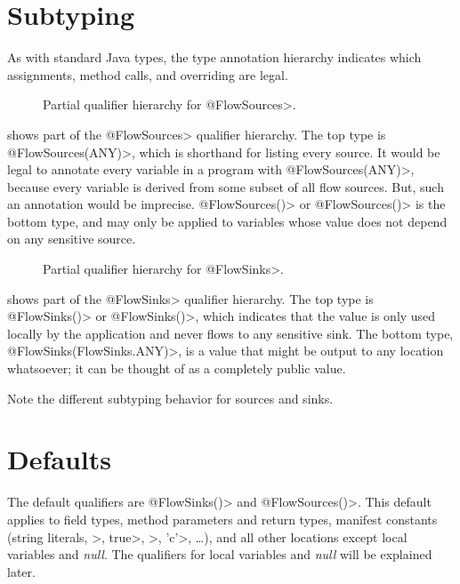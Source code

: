 \section{Subtyping}

As with standard Java types, the type annotation hierarchy indicates which
assignments, method calls, and overriding are legal.


\begin{figure}
\caption{Partial qualifier hierarchy for \<@FlowSources>.}
\label{fig:flowsources-hierarchy}
\end{figure}

 shows part of the \<@FlowSources>
qualifier hierarchy.  The top type is \<@FlowSources(ANY)>, which is
shorthand for listing every source.  It would be legal to annotate every
variable in a program with \<@FlowSources(ANY)>, because every variable is
derived from some subset of all flow sources.  But, such an annotation
would be imprecise.  \<@FlowSources(\ttcbs)> or \<@FlowSources()> is the
bottom type, and may only
be applied to variables whose value does not depend on any sensitive
source.


\begin{figure}
\caption{Partial qualifier hierarchy for \<@FlowSinks>.}
\label{fig:flowsinks-hierarchy}
\end{figure}

 shows part of the \<@FlowSinks>
qualifier hierarchy.  The top type is \<@FlowSinks(\ttcbs)> or
\<@FlowSinks()>, which indicates
that the value is only used locally by the application and never flows to
any sensitive sink.  The bottom type, \<@FlowSinks(FlowSinks.ANY)>, is a
value that might be output to any location whatsoever; it can be thought of
as a completely public value.

Note the different subtyping behavior for sources and sinks.


\section{Defaults\label{flow-defaults}}

The default qualifiers are \<@FlowSinks({})> and \<@FlowSources({})>.  This
default applies to field types, method parameters and return types,
manifest constants
(string literals, >, \<true>, >, \<'c'>,
\ldots), and all other locations except local variables and \emph{null}. The qualifiers for local variables and \emph{null} will be explained later. 

